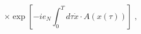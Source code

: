 \begin{equation}\label{eq:aux}
\times \exp[- i e_N \int_{0}^T d\tau {\dot x} \cdot A(x(\tau))] \;, 
\end{equation}

